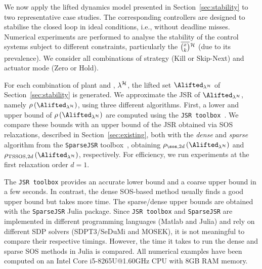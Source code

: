 We now apply the lifted dynamics model presented in Section~\ref{sec:stability} to two representative case studies.
The corresponding controllers are designed to stabilise the closed loop in ideal conditions, i.e., without deadline misses.
Numerical experiments are performed to analyse the stability of the control systems subject to different constraints, particularly the $\eanymiss{}{\strat}$ (due to its prevalence).
%
We consider all combinations of strategy (Kill or Skip-Next) and actuator mode (Zero or Hold).

For each combination of plant and \ewhc{}, $\lambda^{\mathcal{H}}$, the lifted set $\Alifted_{\lambda^\strat}$ of Section~\ref{sec:stability} is generated.
%
We approximate the JSR of $\Alifted_{\lambda^\strat}$, namely $\rho \left( \Alifted_{\lambda^\strat} \right)$, using three different algorithms.
First, a lower and upper bound of $\rho \left( \Alifted_{\lambda^\strat} \right)$ are computed using the \texttt{JSR toolbox}~\cite{vankeerberghen2014jsr}.
We compare these bounds with an upper bound of the JSR obtained via SOS relaxations, described in Section~\ref{sec:existing}, both with the \emph{dense} and \emph{sparse} algorithm from the \texttt{SparseJSR} toolbox~\cite{sparsejsr}, obtaining $\rho_{\sos,2d}\left(\Alifted_{\lambda^\strat}\right)$ and $\rho_{\textrm{TSSOS},2d}\left(\Alifted_{\lambda^\strat}\right)$, respectively.
%
For efficiency, we run experiments at the first relaxation order $d = 1$.

The \texttt{JSR toolbox} provides an accurate lower bound and a coarse upper bound in a few seconds.
In contrast, the dense SOS-based method usually finds a good upper bound but takes more time.
The sparse/dense upper bounds are obtained with the \texttt{SparseJSR} Julia package.
Since \texttt{JSR toolbox} and \texttt{SparseJSR} are implemented in different programming languages (Matlab and Julia) and rely on different SDP solvers (SDPT3/SeDuMi and MOSEK), it is not meaningful to compare their respective timings.
However, the time it takes to run the dense and sparse SOS methods in Julia is compared.
All numerical examples have been computed on an Intel Core i5-8265U@1.60GHz CPU with 8GB RAM memory.

